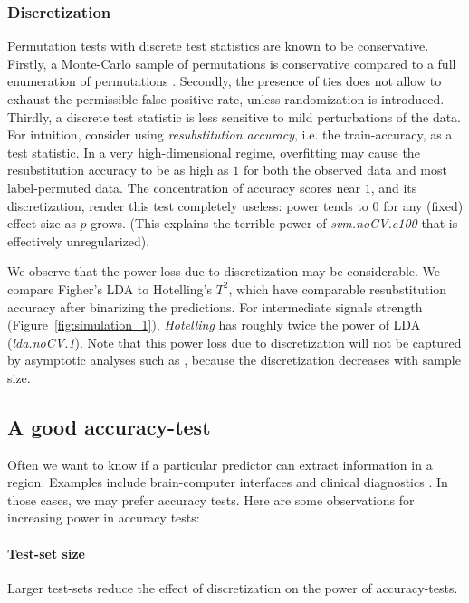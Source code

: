 \documentclass[oupdraft]{bio}
\begin{document}
\subsubsection{Discretization}
Permutation tests with discrete test statistics are known to be conservative.
Firstly, a Monte-Carlo sample of permutations is conservative compared to a full enumeration of permutations \citep{hemerik_exact_2014}.
Secondly, the presence of ties does not allow to exhaust the permissible false positive rate, unless randomization is introduced.
Thirdly, a discrete test statistic is less sensitive to mild perturbations of the data.
For intuition, consider using \emph{resubstitution accuracy}, i.e. the train-accuracy, as a test statistic. 
In a very high-dimensional regime, overfitting may cause the resubstitution accuracy to be as high as $1$ for both the observed data and most label-permuted data.
The concentration of accuracy scores near $1$, and its discretization, render this test completely useless: power tends to $0$ for any (fixed) effect size as $p$ grows. 
(This explains the terrible power of \emph{svm.noCV.c100} that is effectively unregularized). 

We observe that the power loss due to discretization may be considerable.
We compare Figher's LDA to Hotelling's $T^2$, which have comparable resubstitution accuracy after binarizing the predictions. 
For intermediate signals strength (Figure~\ref{fig:simulation_1}), \emph{Hotelling} has roughly twice the power of LDA (\emph{lda.noCV.1}).
Note that this power loss due to discretization will not be captured by asymptotic analyses such as \cite{ramdas_classification_2016}, 
because the discretization decreases with sample size. 



\subsection{A good accuracy-test}
Often we want to know if a particular predictor can extract information in a region. 
Examples include brain-computer interfaces and clinical diagnostics \citep{olivetti_induction_2012,wager_fmri-based_2013}. 
In those cases, we may prefer accuracy tests. Here are some observations for increasing power in accuracy tests:
\paragraph{Test-set size} Larger test-sets reduce the effect of discretization on the power of accuracy-tests.
\end{document}
